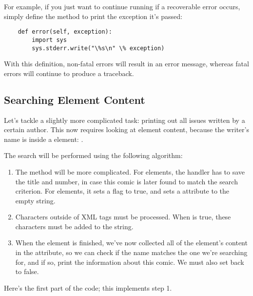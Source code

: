 \documentclass{howto}
\newcommand{\element}[1]{\code{#1}}
\begin{document}
For example, if you just want to continue running if a recoverable
error occurs, simply define the  method to print the
exception it's passed:

\begin{verbatim}
    def error(self, exception):
        import sys
        sys.stderr.write("\%s\n" \% exception)
\end{verbatim}

With this definition, non-fatal errors will result in an error message,
whereas fatal errors will continue to produce a traceback.

\subsection{Searching Element Content}

Let's tackle a slightly more complicated task: printing out all issues
written by a certain author.  This now requires looking at element
content, because the writer's name is inside a \element{writer}
element: .

The search will be performed using the following algorithm:

\begin{enumerate}
\item 
The  method will be more complicated.  For
\element{comic} elements, the handler has to save the title and
number, in case this comic is later found to match the search
criterion.  For \element{writer} elements, it sets a
 flag to true, and sets a 
attribute to the empty string.

\item Characters outside of XML tags must be processed.  When
 is true, these characters must be added to the
 string.

\item When the \element{writer} element is finished, we've now
collected all of the element's content in the 
attribute, so we can check if the name matches the one we're searching 
for, and if so, print the information about this comic.  We must also
set  back to false.
\end{enumerate}

Here's the first part of the code; this implements step 1.
\end{document}
